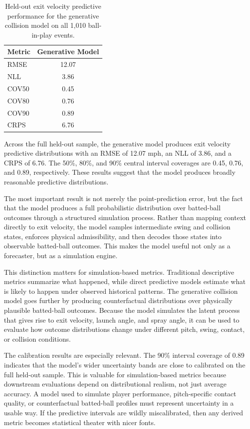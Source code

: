 \documentclass[11pt]{article}
\begin{document}
\begin{table}[H]
\centering
\caption{Held-out exit velocity predictive performance for the generative collision model on all 1,010 ball-in-play events.}
\label{tab:ev-full-holdout-generative}
\begin{tabular}{lc}
\hline
Metric & Generative Model \\
\hline
RMSE & 12.07 \\
NLL & 3.86 \\
COV50 & 0.45 \\
COV80 & 0.76 \\
COV90 & 0.89 \\
CRPS & 6.76 \\
\hline
\end{tabular}
\end{table}

Across the full held-out sample, the generative model produces exit velocity predictive distributions with an RMSE of 12.07 mph, an NLL of 3.86, and a CRPS of 6.76. The 50\%, 80\%, and 90\% central interval coverages are 0.45, 0.76, and 0.89, respectively. These results suggest that the model produces broadly reasonable predictive distributions.

The most important result is not merely the point-prediction error, but the fact that the model produces a full probabilistic distribution over batted-ball outcomes through a structured simulation process. Rather than mapping context directly to exit velocity, the model samples intermediate swing and collision states, enforces physical admissibility, and then decodes those states into observable batted-ball outcomes. This makes the model useful not only as a forecaster, but as a simulation engine.

This distinction matters for simulation-based metrics. Traditional descriptive metrics summarize what happened, while direct predictive models estimate what is likely to happen under observed historical patterns. The generative collision model goes further by producing counterfactual distributions over physically plausible batted-ball outcomes. Because the model simulates the latent process that gives rise to exit velocity, launch angle, and spray angle, it can be used to evaluate how outcome distributions change under different pitch, swing, contact, or collision conditions.

The calibration results are especially relevant. The 90\% interval coverage of 0.89 indicates that the model's wider uncertainty bands are close to calibrated on the full held-out sample. This is valuable for simulation-based metrics because downstream evaluations depend on distributional realism, not just average accuracy. A model used to simulate player performance, pitch-specific contact quality, or counterfactual batted-ball profiles must represent uncertainty in a usable way. If the predictive intervals are wildly miscalibrated, then any derived metric becomes statistical theater with nicer fonts.
\end{document}
